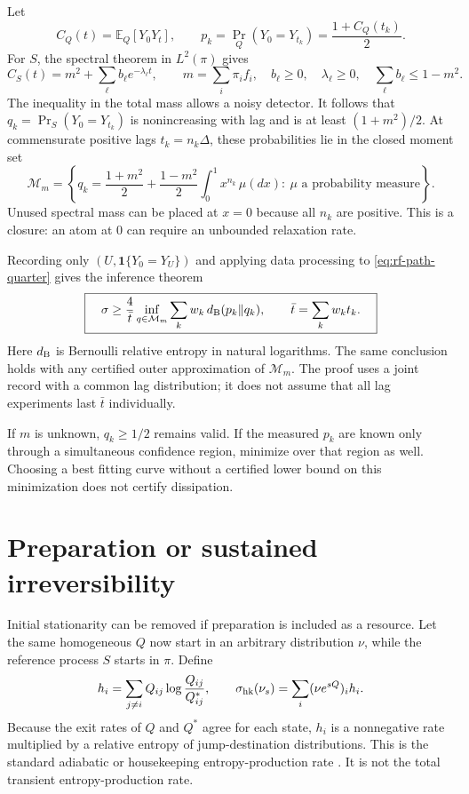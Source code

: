 Let
\begin{equation}
 C_Q(t)=\mathbb E_Q[Y_0Y_t],\qquad
 p_k=\Pr_Q(Y_0=Y_{t_k})=\frac{1+C_Q(t_k)}{2}.
\end{equation}
For $S$, the spectral theorem in $L^2(\pi)$ gives
\begin{equation}
 C_S(t)=m^2+\sum_\ell b_\ell e^{-\lambda_\ell t},\qquad
 m=\sum_i\pi_if_i,\quad b_\ell\ge0,\quad \lambda_\ell\ge0,
 \quad \sum_\ell b_\ell\le1-m^2.
 \label{eq:rf-positive-spectrum}
\end{equation}
The inequality in the total mass allows a noisy detector. It follows that
$q_k=\Pr_S(Y_0=Y_{t_k})$ is nonincreasing with lag and is at least
$(1+m^2)/2$. At commensurate positive lags $t_k=n_k\Delta$, these
probabilities lie in the closed moment set
\begin{equation}
 \mathcal M_m=\left\{
 q_k=\frac{1+m^2}{2}+\frac{1-m^2}{2}
 \int_0^1 x^{n_k}\,\mu(dx):\ \mu\text{ a probability measure}\right\}.
 \label{eq:rf-moment-set}
\end{equation}
Unused spectral mass can be placed at $x=0$ because all $n_k$ are positive.
This is a closure: an atom at $0$ can require an unbounded relaxation rate.

Recording only $(U,\mathbf1\{Y_0=Y_U\})$ and applying data processing to
\eqref{eq:rf-path-quarter} gives the inference theorem
\begin{equation}
 \boxed{\quad
 \sigma\ge\frac{4}{\bar t}
 \inf_{q\in\mathcal M_m}\sum_k w_k\,
 d_{\rm B}(p_k\Vert q_k),\qquad
 \bar t=\sum_kw_kt_k.
 \quad}
 \label{eq:rf-energy-cone}
\end{equation}
Here $d_{\rm B}$ is Bernoulli relative entropy in natural logarithms.
The same conclusion holds with any certified outer approximation of
$\mathcal M_m$. The proof uses a joint record with a common lag distribution;
it does not assume that all lag experiments last $\bar t$ individually.

If $m$ is unknown, $q_k\ge1/2$ remains valid. If the measured $p_k$ are
known only through a simultaneous confidence region, minimize over that
region as well. Choosing a best fitting curve without a certified lower
bound on this minimization does not certify dissipation.

\section{Preparation or sustained irreversibility}

Initial stationarity can be removed if preparation is included as a resource.
Let the same homogeneous $Q$ now start in an arbitrary distribution $\nu$,
while the reference process $S$ starts in $\pi$. Define
\begin{equation}
 h_i=\sum_{j\ne i}Q_{ij}\log\frac{Q_{ij}}{Q^*_{ij}},\qquad
 \sigma_{\rm hk}(\nu_s)=\sum_i(\nu e^{sQ})_i h_i.
\end{equation}
Because the exit rates of $Q$ and $Q^*$ agree for each state, $h_i$ is a
nonnegative rate multiplied by a relative entropy of jump-destination
distributions. This is the standard adiabatic or housekeeping
entropy-production rate \cite{rfEsposito2010}. It is not the total transient
entropy-production rate.

